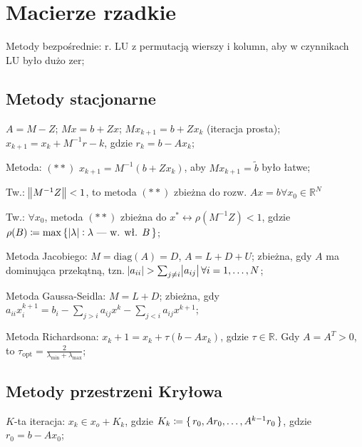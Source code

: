 \section{Macierze rzadkie}

\entry
Metody bezpośrednie:
r. LU z permutacją wierszy i kolumn, aby w czynnikach LU było dużo zer;


\subsection{Metody stacjonarne}

\entry
$A=M-Z$;
\entry
$Mx=b+Zx$;
\entry
$Mx_{k+1}=b+Zx_{k}$ (iteracja prosta);
\entry
$x_{k+1}=x_k+M^{-1}r-k$, gdzie $r_k=b-Ax_k$;

\entry
Metoda: $\mathrm{(**)}$ $x_{k+1}=M^{-1}(b+Zx_k)$,
aby $Mx_{k+1}=\tilde{b}$ było łatwe;

\entry
Tw.: $\norm{M^{-1}Z} < 1$,
to metoda $\mathrm{(**)}$ zbieżna do rozw. $Ax=b \forall x_0 \in \mathbb{R}^N$

\entry
Tw.: $\forall x_0$,
metoda $\mathrm{(**)}$
zbieżna do $x^* \leftrightarrow \rho(M^{-1}Z) < 1$,
gdzie $\rho(B) \coloneqq \max\set{\abs{\lambda} : \lambda\text{ --- w. wł. } B}$;

\entry
Metoda Jacobiego:
$M=\mathrm{diag}(A) = D$, $A=L+D+U$;
zbieżna, gdy $A$ ma dominująca przekątną,
tzn. $\abs{a_{ii}} > \sum_{j\neq i}\abs{a_{ij}} \forall i=1, \ldots, N$;

\entry
Metoda Gaussa-Seidla:
$M = L + D$;
zbieżna, gdy $a_{ii}x_i^{k+1}=b_i-\sum_{j>i}a_{ij}x^k-\sum_{j<i}a_{ij}x^{k+1}$;

\entry
Metoda Richardsona:
$x_k+1 = x_k + \tau(b-Ax_k)$, gdzie $\tau\in\mathbb{R}$.
Gdy $A=A^T>0$,
to $\tau_{\mathrm{opt}}=\frac{2}{\lambda_{\mathrm{min}} + \lambda_{\mathrm{max}} }$;

\subsection{Metody przestrzeni Kryłowa}

\entry
$K$-ta iteracja:
$x_k\in x_o+K_k$,
gdzie $K_k\coloneqq \set{r_0, Ar_0,\ldots, A^{k-1}r_0}$,
gdzie $r_0=b-Ax_0$;

